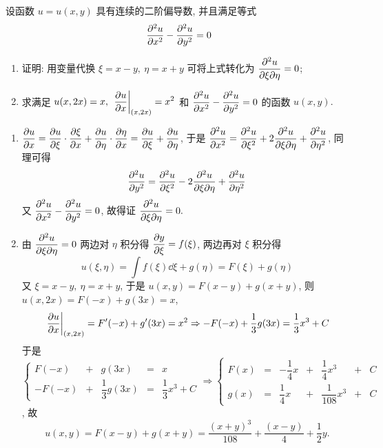 \begin{example}
    设函数 $u=u(x,y)$ 具有连续的二阶偏导数, 并且满足等式 $$\pdv[2]{u}{x}-\pdv[2]{u}{y}=0$$
    \begin{enumerate}[label=(\arabic{*})]
        \item 证明: 用变量代换 $\xi=x-y,~\eta=x+y$ 可将上式转化为 $\displaystyle\pdv{u}{\xi}{\eta}=0$;
        \item 求满足 $\displaystyle u(x,2x)=x,~\eval{\pdv{u}{x}}_{(x,2x)}=x^2$ 和 $\displaystyle\pdv[2]{u}{x}-\pdv[2]{u}{y}=0$ 的函数 $u(x,y).$
    \end{enumerate}
\end{example}
\begin{solution}
    \begin{enumerate}[label=(\arabic{*})]
        \item $\displaystyle\pdv{u}{x}=\pdv{u}{\xi}\cdot\pdv{\xi}{x}+\pdv{u}{\eta}\cdot\pdv{\eta}{x}=\pdv{u}{\xi}+\pdv{u}{\eta}$, 于是 $\displaystyle\pdv[2]{u}{x}=\pdv[2]{u}{\xi}+2\pdv{u}{\xi}{\eta}+\pdv[2]{u}{\eta}$, 同理可得
              $$\pdv[2]{u}{y}=\pdv[2]{u}{\xi}-2\pdv{u}{\xi}{\eta}+\pdv[2]{u}{\eta}$$
              又 $\displaystyle \pdv[2]{u}{x}-\pdv[2]{u}{y}=0$, 故得证 $\displaystyle\pdv{u}{\xi}{\eta}=0.$
        \item 由 $\displaystyle\pdv{u}{\xi}{\eta}=0$ 两边对 $\eta$ 积分得 $\displaystyle\pdv{y}{\xi}=f(\xi)$, 两边再对 $\xi$ 积分得 $$u(\xi,\eta)=\int f(\xi) \dd \xi+g(\eta)=F(\xi)+g(\eta)$$
              又 $\xi=x-y,~\eta=x+y$, 于是 $u(x,y)=F(x-y)+g(x+y)$, 则 $u(x,2x)=F(-x)+g(3x)=x$,
              $$\eval{\pdv{u}{x}}_{(x,2x)}=F'(-x)+g'(3x)=x^2\Rightarrow -F(-x)+\dfrac{1}{3}g(3x)=\dfrac{1}{3}x^3+C$$
              于是 $\left\{\begin{matrix}
                      F(-x)  & + & g(3x)             & = & x                 \\[6pt]
                      -F(-x) & + & \dfrac{1}{3}g(3x) & = & \dfrac{1}{3}x^3+C
                  \end{matrix}\right.\Rightarrow \left\{\begin{matrix}
                      F(x) & = & -\dfrac{1}{4}x & + & \dfrac{1}{4}x^3   & + & C \\[6pt]
                      g(x) & = & \dfrac{1}{4}x  & + & \dfrac{1}{108}x^3 & + & C
                  \end{matrix}\right.$, 故
              $$u(x,y)=F(x-y)+g(x+y)=\dfrac{(x+y)^3}{108}+\dfrac{(x-y)}{4}+\dfrac{1}{2}y.$$
    \end{enumerate}
\end{solution}